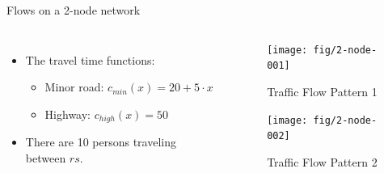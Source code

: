 \documentclass[handout]{beamer}
\begin{document}
\begin{frame}{Flows on a 2-node network}
\begin{columns}
\begin{itemize}
\item The travel time functions: 
\begin{itemize}
	\item Minor road: $ c_{min}(x) = 20 + 5 \cdot x$
	\item Highway: $c_{high}(x) = 50 $
\end{itemize}
\item There are 10 persons traveling between $rs$. 
\end{itemize}
\begin{example}
\begin{figure}
\centering
\texttt{[image: fig/2-node-001]}
\caption{Traffic Flow Pattern 1}
\end{figure}%
\begin{figure}
\centering
\texttt{[image: fig/2-node-002]}
\caption{Traffic Flow Pattern 2}
\end{figure}
\end{example}
\end{columns}

\end{frame}
\end{document}
